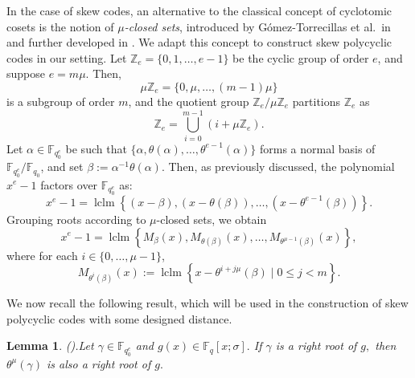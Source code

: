 \documentclass[12pt,paper]{article}
\theoremstyle{plain}
\newtheorem{lemma}[theorem]{Lemma} %
\DeclareMathOperator{\lclm}{lclm}
\begin{document}
In the case of skew codes, an alternative to the classical concept of cyclotomic cosets is the notion of  \emph{$\mu$-closed sets}, introduced by Gómez-Torrecillas et al.\ in \cite{Lobillo2017} and further developed in \cite{Alfarano2021, Cathryn2024, Lobillo2025}. We adapt this concept to construct skew polycyclic codes in our setting. Let $\mathbb{Z}_e = \{0,1,\ldots,e-1\}$ be the cyclic group of order $e$, and suppose $e = m\mu$. Then,
$$
\mu \mathbb{Z}_e = \{0, \mu, \ldots, (m-1)\mu\}
$$
is a subgroup of order $m$, and the quotient group $\mathbb{Z}_e / \mu \mathbb{Z}_e$ partitions $\mathbb{Z}_e$ as
$$
\mathbb{Z}_e = \bigcup_{i=0}^{m-1} (i + \mu \mathbb{Z}_e).
$$
Let $\alpha \in \mathbb{F}_{q_0^e}$ be such that $\{\alpha, \theta(\alpha), \ldots, \theta^{e-1}(\alpha)\}$ forms a normal basis of $\mathbb{F}_{q_0^e}/\mathbb{F}_{q_0}$, and set $\beta := \alpha^{-1} \theta(\alpha)$. Then, as previously discussed, the polynomial $x^e - 1$ factors over $\mathbb{F}_{q_0^e}$ as:
$$
x^e - 1 = \lclm\left\{ (x - \beta), (x - \theta(\beta)), \ldots, (x - \theta^{e-1}(\beta)) \right\}.
$$
Grouping roots according to $\mu$-closed sets, we obtain
$$
x^e - 1 = \lclm\left\{ M_{\beta}(x), M_{\theta(\beta)}(x), \ldots, M_{\theta^{\mu - 1}(\beta)}(x) \right\},
$$
where for each $i \in \{0, \ldots, \mu - 1\}$,
$$
M_{\theta^i(\beta)}(x) := \lclm \left\{ x - \theta^{i + j\mu}(\beta) \mid 0 \leq j < m \right\}.
$$

We now recall the following result, which will be used in the construction of skew polycyclic codes with some designed distance.

\begin{lemma}(\cite[Lemma 5]{Lobillo2025}).\label{Skew_Roots}
Let $ \gamma  \in \mathbb{F}_{q_0^e} $ and $g(x)\in \mathbb{F}_{q}[x;\sigma].$ If $ \gamma   $ is a right root of $g,$ then $ \theta^{\mu}(\gamma)$ is also a right root of $g.$ 
\end{lemma}
\end{document}
